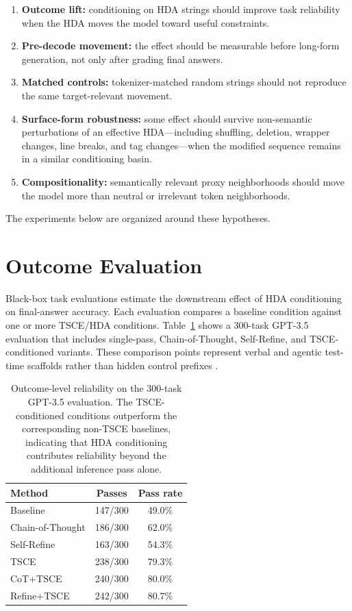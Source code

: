 \documentclass[11pt]{article}
\newcommand{\tsce}{\textsc{TSCE}}
\newcommand{\hda}{\textsc{HDA}}
\begin{document}
\begin{enumerate}
    \item \textbf{Outcome lift:} conditioning on \hda{} strings should improve task reliability when the \hda{} moves the model toward useful constraints.
    \item \textbf{Pre-decode movement:} the effect should be measurable before long-form generation, not only after grading final answers.
    \item \textbf{Matched controls:} tokenizer-matched random strings should not reproduce the same target-relevant movement.
    \item \textbf{Surface-form robustness:} some effect should survive non-semantic perturbations of an effective \hda{}---including shuffling, deletion, wrapper changes, line breaks, and tag changes---when the modified sequence remains in a similar conditioning basin.
    \item \textbf{Compositionality:} semantically relevant proxy neighborhoods should move the model more than neutral or irrelevant token neighborhoods.
\end{enumerate}

The experiments below are organized around these hypotheses.

\section{Outcome Evaluation}

Black-box task evaluations estimate the downstream effect of \hda{} conditioning on final-answer accuracy. Each evaluation compares a baseline condition against one or more \tsce{}/\hda{} conditions. Table~\ref{tab:outcome} shows a 300-task GPT-3.5 evaluation that includes single-pass, Chain-of-Thought, Self-Refine, and \tsce{}-conditioned variants. These comparison points represent verbal and agentic test-time scaffolds rather than hidden control prefixes \cite{cot,self-consistency,self-refine,react}.

\begin{table}[H]
\centering
\begin{tabular}{lcc}
\toprule
Method & Passes & Pass rate \\
\midrule
Baseline & 147/300 & 49.0\% \\
Chain-of-Thought & 186/300 & 62.0\% \\
Self-Refine & 163/300 & 54.3\% \\
\tsce{} & 238/300 & 79.3\% \\
CoT+\tsce{} & 240/300 & 80.0\% \\
Refine+\tsce{} & 242/300 & 80.7\% \\
\bottomrule
\end{tabular}
\caption{Outcome-level reliability on the 300-task GPT-3.5 evaluation. The \tsce{}-conditioned conditions outperform the corresponding non-\tsce{} baselines, indicating that \hda{} conditioning contributes reliability beyond the additional inference pass alone.}
\label{tab:outcome}
\end{table}
\end{document}
